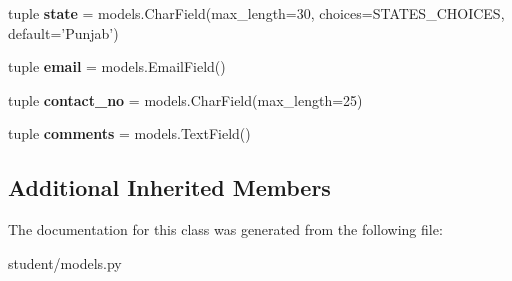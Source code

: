 \begin{DoxyCompactItemize}
\item 
\hypertarget{classsouvenir_1_1student_1_1models_1_1Profile_adc48553ff2f6683deb7e53919bcbbaa3}{tuple {\bfseries state} = models.\-Char\-Field(max\-\_\-length=30, choices=S\-T\-A\-T\-E\-S\-\_\-\-C\-H\-O\-I\-C\-E\-S, default='Punjab')}\label{classsouvenir_1_1student_1_1models_1_1Profile_adc48553ff2f6683deb7e53919bcbbaa3}

\item 
\hypertarget{classsouvenir_1_1student_1_1models_1_1Profile_a3c495abe5a1ab3d76a421e1348417e1e}{tuple {\bfseries email} = models.\-Email\-Field()}\label{classsouvenir_1_1student_1_1models_1_1Profile_a3c495abe5a1ab3d76a421e1348417e1e}

\item 
\hypertarget{classsouvenir_1_1student_1_1models_1_1Profile_a303290799bc6dc7e98dddc9be8eac65e}{tuple {\bfseries contact\-\_\-no} = models.\-Char\-Field(max\-\_\-length=25)}\label{classsouvenir_1_1student_1_1models_1_1Profile_a303290799bc6dc7e98dddc9be8eac65e}

\item 
\hypertarget{classsouvenir_1_1student_1_1models_1_1Profile_a29d21e67add979325d912f83949c3339}{tuple {\bfseries comments} = models.\-Text\-Field()}\label{classsouvenir_1_1student_1_1models_1_1Profile_a29d21e67add979325d912f83949c3339}

\end{DoxyCompactItemize}
\subsection*{Additional Inherited Members}


The documentation for this class was generated from the following file\-:\begin{DoxyCompactItemize}
\item 
student/models.\-py\end{DoxyCompactItemize}
